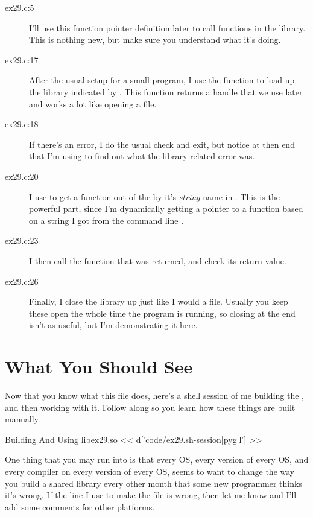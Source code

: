 \begin{description}
\item[ex29.c:5] I'll use this function pointer definition later to call functions
    in the library.  This is nothing new, but make sure you understand what
    it's doing.
\item[ex29.c:17] After the usual setup for a small program, I use the 
    function to load up the library indicated by .  This function
    returns a handle that we use later and works a lot like opening a file.
\item[ex29.c:18] If there's an error, I do the usual check and exit, but notice at
    then end that I'm using  to find out what the library related
    error was.
\item[ex29.c:20] I use  to get a function out of the  
    by it's \emph{string} name in .  This is the powerful
    part, since I'm dynamically getting a pointer to a function based on a
    string I got from the command line .
\item[ex29.c:23] I then call the  function that was returned, and 
    check its return value.
\item[ex29.c:26] Finally, I close the library up just like I would a file.  Usually
    you keep these open the whole time the program is running, so closing at
    the end isn't as useful, but I'm demonstrating it here.
\end{description}

\section{What You Should See}

Now that you know what this file does, here's a shell session of me building
the ,  and then working with it.  Follow
along so you learn how these things are built manually.

\begin{code}{Building And Using libex29.so}
<< d['code/ex29.sh-session|pyg|l'] >>
\end{code}

One thing that you may run into is that every OS, every version of every
OS, and every compiler on every version of every OS, seems to want to change
the way you build a shared library every other month that some new programmer
thinks it's wrong.  If the line I use to make the  file is
wrong, then let me know and I'll add some comments for other platforms.

